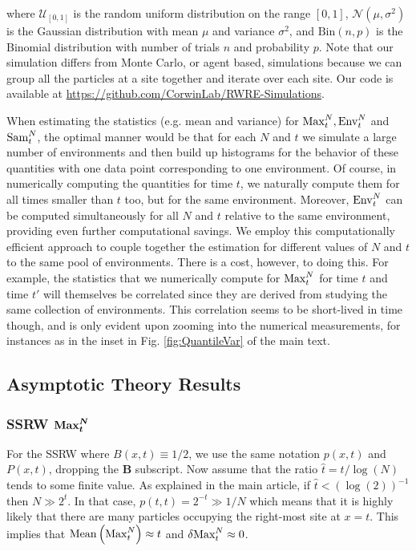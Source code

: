 where $\mathcal{U}_{[0, 1]}$ is the random uniform distribution on the range $[0, 1]$, $\mathcal{N}(\mu, \sigma^2)$ is the Gaussian distribution with mean $\mu$ and variance $\sigma^2$, and $\mathrm{Bin}(n, p)$ is the Binomial distribution with number of trials $n$ and probability $p$. Note that our simulation differs from Monte Carlo, or agent based, simulations because we can group all the particles at a site together and iterate over each site. Our code is available at \url{https://github.com/CorwinLab/RWRE-Simulations}.

When estimating the statistics (e.g. mean and variance) for $\mathrm{Max}^{N}_t,\mathrm{Env}^{N}_t$ and $\mathrm{Sam}^{N}_t$, the optimal manner would be that for each $N$ and $t$ we simulate a large number of environments and then build up histograms for the behavior of these quantities with one data point corresponding to one environment. Of course, in numerically computing the quantities for time $t$, we naturally compute them for all times smaller than $t$ too, but for the same environment. Moreover, $\mathrm{Env}^{N}_t$ can be computed simultaneously for all $N$ and $t$ relative to the same environment, providing even further computational savings. We employ this computationally efficient approach to couple together the estimation for different values of $N$ and $t$ to the same pool of environments. There is a cost, however, to doing this. For example, the statistics that we numerically compute for $\mathrm{Max}^{N}_t$ for time $t$ and time $t'$ will themselves be correlated since they are derived from studying the same collection of environments. This correlation seems to be short-lived in time though, and is only evident upon zooming into the numerical measurements, for instances as in the inset in Fig. \ref{fig:QuantileVar} of the main text.

\subsection{Asymptotic Theory Results}
\subsubsection{SSRW $\boldsymbol{\mathrm{Max}^{N}_t}$}\label{sec:SSRW}For the SSRW where $B(x,t)\equiv 1/2$, we use the same notation $p(x,t)$ and $P(x,t)$, dropping the $\mathbf{B}$ subscript. Now assume that the ratio $\hat{t} = t/\log(N)$ tends to some finite value. As explained in the main article, if $\hat{t}<(\log(2))^{-1}$ then $N\gg 2^t$. In that case, $p(t,t)=2^{-t} \gg 1/N$ which means that it is highly likely that there are many particles occupying the right-most site at $x=t$. This implies that $\mathrm{Mean}\left(\mathrm{Max}^{N}_t\right)\approx t$ and $\var{\mathrm{Max}^{N}_t}\approx 0$.

